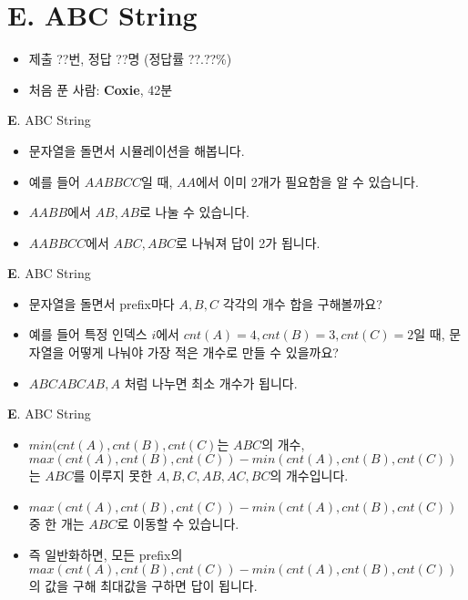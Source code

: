 \section{E. ABC String}

\begin{frame} %
    \begin{itemize}
        \item 제출 ??번, 정답 ??명 (정답률 ??.??\%)
        \item 처음 푼 사람: \textbf{Coxie}, 42분
    \end{itemize}
\end{frame}

\begin{frame}{\textbf{E}. ABC String}
    \begin{itemize}
        \item 문자열을 돌면서 시뮬레이션을 해봅니다.
        \item 예를 들어 $AABBCC$일 때, $AA$에서 이미 2개가 필요함을 알 수 있습니다.
        \item $AABB$에서 $AB, AB$로 나눌 수 있습니다.
        \item $AABBCC$에서 $ABC, ABC$로 나눠져 답이 2가 됩니다.
    \end{itemize}
\end{frame}

\begin{frame}{\textbf{E}. ABC String}
    \begin{itemize}
        \item 문자열을 돌면서 prefix마다 $A, B, C$ 각각의 개수 합을 구해볼까요?
        \item 예를 들어 특정 인덱스 $i$에서 $cnt(A)=4, cnt(B)=3, cnt(C)=2$일 때, 문자열을 어떻게 나눠야 가장 적은 개수로 만들 수 있을까요?
        \item $ABCABCAB, A$ 처럼 나누면 최소 개수가 됩니다.
    \end{itemize}
\end{frame}

\begin{frame}{\textbf{E}. ABC String}
    \begin{itemize}
        \item $min(cnt(A),cnt(B),cnt(C)$는 $ABC$의 개수, $max(cnt(A),cnt(B),cnt(C))-min(cnt(A),cnt(B),cnt(C))$는 $ABC$를 이루지 못한 $A,B,C,AB,AC,BC$의 개수입니다.
        \item $max(cnt(A),cnt(B),cnt(C))-min(cnt(A),cnt(B),cnt(C))$ 중 한 개는 $ABC$로 이동할 수 있습니다.
        \item 즉 일반화하면, 모든 prefix의 $max(cnt(A),cnt(B),cnt(C))-min(cnt(A),cnt(B),cnt(C))$의 값을 구해 최대값을 구하면 답이 됩니다.
    \end{itemize}
\end{frame}